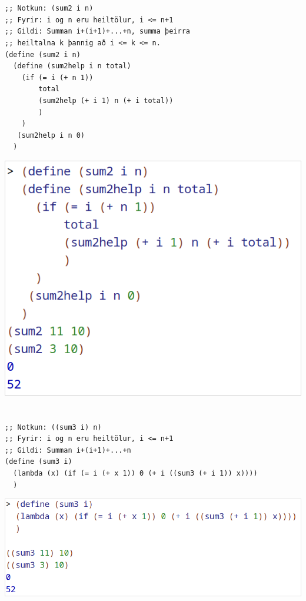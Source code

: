 \documentclass{article}
\begin{document}
	\section{}
	\begin{verbatim}
;; Notkun: (sum2 i n)
;; Fyrir: i og n eru heiltölur, i <= n+1
;; Gildi: Summan i+(i+1)+...+n, summa þeirra
;; heiltalna k þannig að i <= k <= n.
(define (sum2 i n)
  (define (sum2help i n total)
    (if (= i (+ n 1))
        total
        (sum2help (+ i 1) n (+ i total))
        )
    )
   (sum2help i n 0)
  )
	\end{verbatim}
	\begin{center}
		\includegraphics[scale=0.35]{sum2.png}
	\end{center}

	\newpage
	\section{}
	\begin{verbatim}
;; Notkun: ((sum3 i) n)
;; Fyrir: i og n eru heiltölur, i <= n+1
;; Gildi: Summan i+(i+1)+...+n
(define (sum3 i)
  (lambda (x) (if (= i (+ x 1)) 0 (+ i ((sum3 (+ i 1)) x))))
  )
	\end{verbatim}
	\begin{center}
		\includegraphics[scale=0.35]{sum3.png}
	\end{center}
\end{document}
